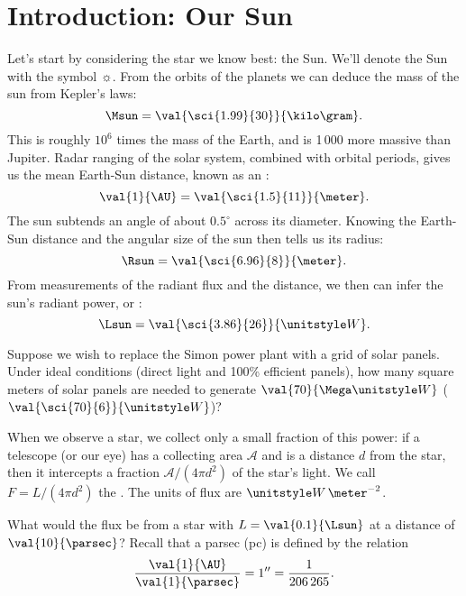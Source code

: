 
\section{Introduction: Our Sun}

Let's start by considering the star we know best: the Sun.  We'll denote the Sun with the symbol $\sun$.  From the orbits of the planets we can deduce the mass of the sun from Kepler's laws:
\[
	\Msun = \val{\sci{1.99}{30}}{\kilo\gram}.
\]
This is roughly $10^{6}$ times the mass of the Earth, and is 1\,000 more massive than Jupiter.
Radar ranging of the solar system, combined with orbital periods, gives us the mean Earth-Sun distance, known as an :
\[
	\val{1}{\AU} = \val{\sci{1.5}{11}}{\meter}.
\]
The sun subtends an angle of about $0.5^{\circ}$ across its diameter. Knowing the Earth-Sun distance and the angular size of the sun then tells us its radius:
\[
	\Rsun = \val{\sci{6.96}{8}}{\meter}.
\]
From measurements of the radiant flux and the distance, we then can infer the sun's radiant power, or :
\[
	\Lsun = \val{\sci{3.86}{26}}{\watt}.
\]

\begin{exercisebox}
Suppose we wish to replace the Simon power plant with a grid of solar panels. Under ideal conditions (direct light and 100\% efficient panels), how many square meters of solar panels are needed to generate $\val{70}{\Mega\watt}$ ($\val{\sci{70}{6}}{\watt}$)?
\end{exercisebox}

When we observe a star, we collect only a small fraction of this power: if a telescope (or our eye) has a collecting area $\mathcal{A}$ and is a distance $d$ from the star, then it intercepts a fraction $\mathcal{A}/(4\pi d^{2})$ of the star's light.  We call $F = L/(4\pi d^{2})$ the . The units of flux are $\watt\,\meter^{-2}$.

\begin{exercisebox}
What would the flux be from a star with $L = \val{0.1}{\Lsun}$ at a distance of $\val{10}{\parsec}$?
Recall that a parsec (pc) is defined by the relation
\[
	\frac{\val{1}{\AU}}{\val{1}{\parsec}} = 1'' = \frac{1}{206\,265}.
\]
\end{exercisebox}

